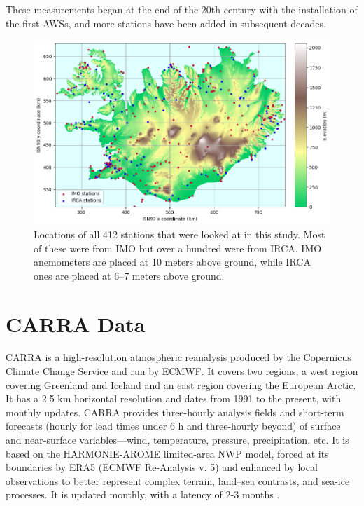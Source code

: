 These measurements began at the end of the 20th century with the installation of the first AWSs, and more stations have been added in subsequent decades.

\begin{figure}
    \centering
    \includegraphics[scale = 0.6]{Figures/station_elevations.png}
    \caption[Locations of automatic weather stations in Iceland]{Locations of all 412 stations that were looked at in this study. Most of these were from IMO but over a hundred were from IRCA. IMO anemometers are placed at 10 meters above ground, while IRCA ones are placed at 6--7 meters above ground.}
    \label{fig:aws_map}
\end{figure}

\section{CARRA Data}
CARRA is a high-resolution atmospheric reanalysis produced by the Copernicus Climate Change Service and run by ECMWF. It covers two regions, a west region covering Greenland and Iceland and an east region covering the European Arctic. It has a 2.5 km horizontal resolution and dates from 1991 to the present, with monthly updates. CARRA provides three-hourly analysis fields and short-term forecasts (hourly for lead times under 6 h and three-hourly beyond) of surface and near-surface variables—wind, temperature, pressure, precipitation, etc. It is based on the HARMONIE-AROME limited-area NWP model, forced at its boundaries by ERA5 (ECMWF Re-Analysis v. 5) and enhanced by local observations to better represent complex terrain, land–sea contrasts, and sea-ice processes. It is updated monthly, with a latency of 2-3 months \cite{carra_information}.

